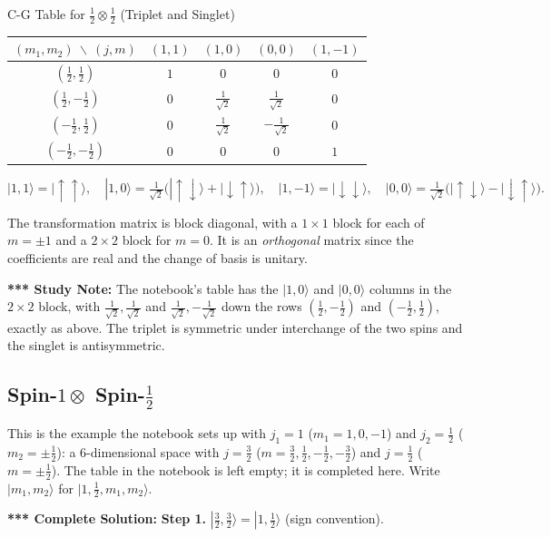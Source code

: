 \documentclass[11pt,a4paper]{article}
\begin{document}
\begin{thm}{C-G Table for $\tfrac12\otimes\tfrac12$ (Triplet and Singlet)}
\begin{center}
\renewcommand{\arraystretch}{1.35}
\begin{tabular}{c|cccc}
$(m_1,m_2)\ \backslash\ (j,m)$ & $(1,1)$ & $(1,0)$ & $(0,0)$ & $(1,-1)$\\
\hline
$(\tfrac12,\tfrac12)$ & $1$ & $0$ & $0$ & $0$\\
$(\tfrac12,-\tfrac12)$ & $0$ & $\tfrac1{\sqrt2}$ & $\tfrac1{\sqrt2}$ & $0$\\
$(-\tfrac12,\tfrac12)$ & $0$ & $\tfrac1{\sqrt2}$ & $-\tfrac1{\sqrt2}$ & $0$\\
$(-\tfrac12,-\tfrac12)$ & $0$ & $0$ & $0$ & $1$
\end{tabular}
\end{center}
\[
|1,1\rangle=|\!\uparrow\uparrow\rangle,\quad |1,0\rangle=\tfrac1{\sqrt2}\big(|\!\uparrow\downarrow\rangle+|\!\downarrow\uparrow\rangle\big),\quad |1,-1\rangle=|\!\downarrow\downarrow\rangle,\quad |0,0\rangle=\tfrac1{\sqrt2}\big(|\!\uparrow\downarrow\rangle-|\!\downarrow\uparrow\rangle\big).
\]
\end{thm}

The transformation matrix is block diagonal, with a $1\times1$ block for each of $m=\pm1$ and a $2\times2$ block for $m=0$. It is an \emph{orthogonal} matrix since the coefficients are real and the change of basis is unitary.

\textbf{*** Study Note:} The notebook's table has the $|1,0\rangle$ and $|0,0\rangle$ columns in the $2\times2$ block, with $\tfrac1{\sqrt2},\tfrac1{\sqrt2}$ and $\tfrac1{\sqrt2},-\tfrac1{\sqrt2}$ down the rows $(\tfrac12,-\tfrac12)$ and $(-\tfrac12,\tfrac12)$, exactly as above. The triplet is symmetric under interchange of the two spins and the singlet is antisymmetric.

\subsection{Spin-\texorpdfstring{$1\otimes$}{1 x} Spin-\texorpdfstring{$\tfrac12$}{1/2}}
This is the example the notebook sets up with $j_1=1$ ($m_1=1,0,-1$) and $j_2=\tfrac12$ ($m_2=\pm\tfrac12$): a 6-dimensional space with $j=\tfrac32$ ($m=\tfrac32,\tfrac12,-\tfrac12,-\tfrac32$) and $j=\tfrac12$ ($m=\pm\tfrac12$). The table in the notebook is left empty; it is completed here. Write $|m_1,m_2\rangle$ for $|1,\tfrac12,m_1,m_2\rangle$.

\textbf{*** Complete Solution:} \textbf{Step 1.} $|\tfrac32,\tfrac32\rangle=|1,\tfrac12\rangle$ (sign convention).
\end{document}
